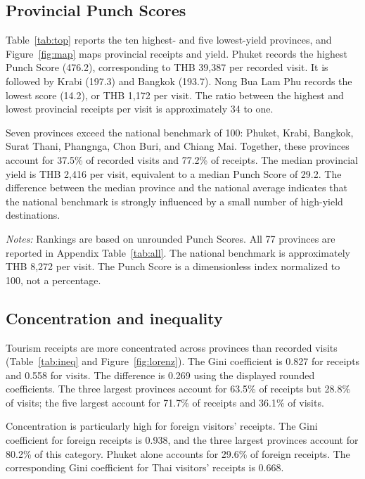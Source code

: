 \documentclass[11pt,a4paper]{article}
\theoremstyle{plain}\newtheorem{proposition}{Proposition}
\theoremstyle{definition}\newtheorem{definition}{Definition}
\begin{document}
\subsection{Provincial Punch Scores}
Table~\ref{tab:top} reports the ten highest- and five lowest-yield provinces, and Figure~\ref{fig:map} maps provincial receipts and yield. Phuket records the highest Punch Score (476.2), corresponding to THB 39,387 per recorded visit. It is followed by Krabi (197.3) and Bangkok (193.7). Nong Bua Lam Phu records the lowest score (14.2), or THB 1,172 per visit. The ratio between the highest and lowest provincial receipts per visit is approximately 34 to one.

Seven provinces exceed the national benchmark of 100: Phuket, Krabi, Bangkok, Surat Thani, Phangnga, Chon Buri, and Chiang Mai. Together, these provinces account for 37.5\% of recorded visits and 77.2\% of receipts. The median provincial yield is THB 2,416 per visit, equivalent to a median Punch Score of 29.2. The difference between the median province and the national average indicates that the national benchmark is strongly influenced by a small number of high-yield destinations.

\begin{table}[t]\centering\scriptsize
\caption{Ten highest and five lowest provincial Punch Scores, 2024}\label{tab:top}
\resizebox{\textwidth}{!}{}\par\smallskip
\parbox{\textwidth}{\scriptsize\emph{Notes:} Rankings are based on unrounded Punch Scores. All 77 provinces are reported in Appendix Table~\ref{tab:all}. The national benchmark is approximately THB 8,272 per visit. The Punch Score is a dimensionless index normalized to 100, not a percentage.}
\end{table}

\subsection{Concentration and inequality}
Tourism receipts are more concentrated across provinces than recorded visits (Table~\ref{tab:ineq} and Figure~\ref{fig:lorenz}). The Gini coefficient is 0.827 for receipts and 0.558 for visits. The difference is 0.269 using the displayed rounded coefficients. The three largest provinces account for 63.5\% of receipts but 28.8\% of visits; the five largest account for 71.7\% of receipts and 36.1\% of visits.

Concentration is particularly high for foreign visitors' receipts. The Gini coefficient for foreign receipts is 0.938, and the three largest provinces account for 80.2\% of this category. Phuket alone accounts for 29.6\% of foreign receipts. The corresponding Gini coefficient for Thai visitors' receipts is 0.668.
\end{document}
